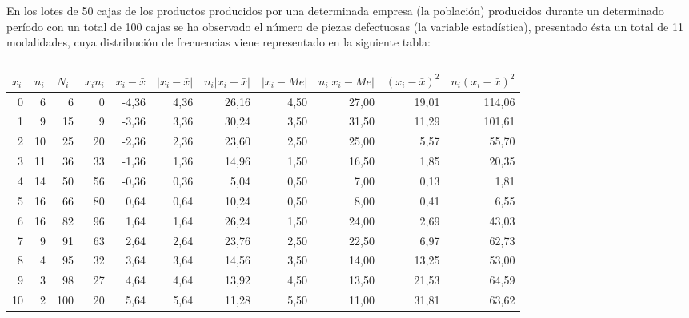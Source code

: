 En los lotes de 50 cajas de los productos producidos por una determinada empresa (la población) producidos durante un determinado período con un total de 100 cajas se ha observado el número de piezas defectuosas (la variable estadística), presentado ésta un total de 11 modalidades, cuya distribución de frecuencias viene representado en la siguiente tabla:
\begin{center}
	\begin{table}[htbp]
		\caption{}
		\begin{tabular}{|r|r|r|r|r|r|r|r|r|r|r|}
			\hline
			\multicolumn{1}{|l|}{$x_{i}$} & \multicolumn{1}{l|}{$n_{i}$} & \multicolumn{1}{l|}{$N_{i}$} & \multicolumn{1}{l|}{$x_{i}n_{i}$} & \multicolumn{1}{l|}{$x_{i} - \bar x$} & \multicolumn{1}{l|}{$|x_{i} - \bar x|$} & \multicolumn{1}{l|}{$n_{i}|x_{i} - \bar x|$} & \multicolumn{1}{l|}{$|x_{i} - Me|$} & \multicolumn{1}{l|}{$n_{i}|x_{i} - Me|$} & \multicolumn{1}{l|}{$(x_{i} - \bar x)^2$} & \multicolumn{1}{l|}{$n_{i}(x_{i} - \bar x)^2$} \\	\hline
			0 & 6 & 6 & 0 & -4,36 & 4,36 & 26,16 & 4,50 & 27,00 & 19,01 & 114,06 \\ \hline
			1 & 9 & 15 & 9 & -3,36 & 3,36 & 30,24 & 3,50 & 31,50 & 11,29 & 101,61 \\ \hline
			2 & 10 & 25 & 20 & -2,36 & 2,36 & 23,60 & 2,50 & 25,00 & 5,57 & 55,70 \\ \hline
			3 & 11 & 36 & 33 & -1,36 & 1,36 & 14,96 & 1,50 & 16,50 & 1,85 & 20,35 \\ \hline
			4 & 14 & 50 & 56 & -0,36 & 0,36 & 5,04 & 0,50 & 7,00 & 0,13 & 1,81 \\ \hline
			5 & 16 & 66 & 80 & 0,64 & 0,64 & 10,24 & 0,50 & 8,00 & 0,41 & 6,55 \\ \hline
			6 & 16 & 82 & 96 & 1,64 & 1,64 & 26,24 & 1,50 & 24,00 & 2,69 & 43,03 \\ \hline
			7 & 9 & 91 & 63 & 2,64 & 2,64 & 23,76 & 2,50 & 22,50 & 6,97 & 62,73 \\ \hline
			8 & 4 & 95 & 32 & 3,64 & 3,64 & 14,56 & 3,50 & 14,00 & 13,25 & 53,00 \\ \hline
			9 & 3 & 98 & 27 & 4,64 & 4,64 & 13,92 & 4,50 & 13,50 & 21,53 & 64,59 \\ \hline
			10 & 2 & 100 & 20 & 5,64 & 5,64 & 11,28 & 5,50 & 11,00 & 31,81 & 63,62 \\ \hline
		\end{tabular}
		\label{Tabla de datos}
	\end{table}
	
	
	
\end{center}
